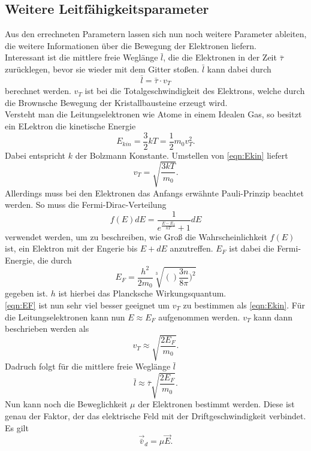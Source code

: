 \subsection{Weitere Leitfähigkeitsparameter}
Aus den errechneten Parametern lassen sich nun noch weitere Parameter ableiten, die weitere Informationen 
über die Bewegung der Elektronen liefern.\\
Interessant ist die mittlere freie Weglänge $\bar{l}$, die die Elektronen in der Zeit $\bar{\tau}$ zurücklegen, bevor
sie wieder mit dem Gitter stoßen. $\bar{l}$ kann dabei durch
\begin{equation}
    \bar{l}=\bar{\tau}\cdot v_T
\end{equation}
berechnet werden. $v_T$ ist bei die Totalgeschwindigkeit des Elektrons, welche durch die Brownsche Bewegung 
der Kristallbausteine erzeugt wird.\\
Versteht man die Leitungselektronen wie Atome in einem Idealen Gas, so besitzt ein ELektron die kinetische Energie
\begin{equation}
    E_{kin}=\frac{3}{2}kT=\frac{1}{2}m_0v_T^2. \label{eqn:Ekin}
\end{equation}
Dabei entspricht $k$ der Bolzmann Konstante. Umstellen von \eqref{eqn:Ekin} liefert
\begin{equation}
    v_T=\sqrt{\frac{3kT}{m_0}}. \label{eqn:vT1}
\end{equation}
Allerdings muss bei den Elektronen das Anfangs erwähnte Pauli-Prinzip beachtet werden. So muss die Fermi-Dirac-Verteilung
\begin{equation}
    f(E)dE=\frac{1}{e^{\frac{E-E_f}{kT}}+1}dE
\end{equation}
verwendet werden, um zu beschreiben, wie Groß die Wahrscheinlichkeit $f(E)$ ist, ein 
Elektron mit der Engerie bis $E+dE$ anzutreffen. $E_F$ ist dabei die Fermi-Energie, die durch
\begin{equation}
    E_F=\frac{h^2}{2m_0}\sqrt[3]{()\frac{3n}{8\pi})^2} \label{eqn:EF}
\end{equation}
gegeben ist. $h$ ist hierbei das Plancksche Wirkungsquantum. \\
\eqref{eqn:EF} ist nun sehr viel besser geeignet um $v_T$ zu bestimmen als \ref{eqn:Ekin}. 
Für die Leitungselektronen kann nun $E \approx E_F$ aufgenommen werden.
$v_T$ kann dann beschrieben werden als
\begin{equation}
    v_T\approx\sqrt{\frac{2E_F}{m_0}}.
\end{equation}
Dadruch folgt für die mittlere freie Weglänge $\bar{l}$
\begin{equation}
    \bar{l}\approx\bar{\tau}\sqrt{\frac{2E_F}{m_0}}.
\end{equation}
Nun kann noch die Beweglichkeit $\mu$ der Elektronen bestimmt werden. Diese ist genau der Faktor, der 
das elektrische Feld mit der Driftgeschwindigkeit verbindet. Es gilt
\begin{equation}
    \vec{\bar{v}}_d=\mu \vec{E}.
\end{equation}
